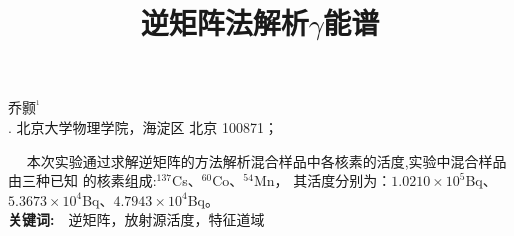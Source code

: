 \documentclass[a4paper,10.0pt,twoside]{npr}
\begin{document}
\setcounter{page}{001}%
\begin{center}
\title{%
\xiaoerhao \bf  %
逆矩阵法解析$\gamma$能谱\\[-5mm]}
\maketitle
\large \fs
乔颢$^{^1}$\\[2mm]

\xiaowu {}. 北京大学物理学院，海淀区 北京 100871；\\[4mm]

 

\parbox{158mm} {
~~\fs
本次实验通过求解逆矩阵的方法解析混合样品中各核素的活度,实验中混合样品由三种已知
的核素组成:$^{137}$Cs、$^{60}$Co、$^{54}$Mn， 其活度分别为：$1.0210\times 10^{5}$Bq、$5.3673\times 10^{4}$Bq、$4.7943\times 10^{4}$Bq。\\

{\bf 关键词:}~~\fs 逆矩阵，放射源活度，特征道域}\\
\end{center}
\vspace{5mm}
\setcounter{section}{0}
\end{document}
